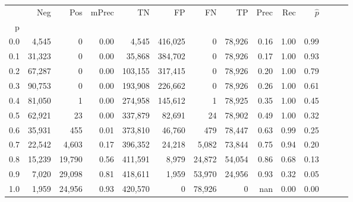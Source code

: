 \begin{tabular}{rrrrrrrrrrrrrr}
\toprule
{} &     Neg &     Pos & mPrec &       TN &       FP &      FN &      TP &  Prec &   Rec & $\hat{p}$ \\
p   &         &         &       &          &          &         &         &       &       &           \\
\midrule
0.0 &   4,545 &       0 &  0.00 &    4,545 &  416,025 &       0 &  78,926 &  0.16 &  1.00 &      0.99 \\
0.1 &  31,323 &       0 &  0.00 &   35,868 &  384,702 &       0 &  78,926 &  0.17 &  1.00 &      0.93 \\
0.2 &  67,287 &       0 &  0.00 &  103,155 &  317,415 &       0 &  78,926 &  0.20 &  1.00 &      0.79 \\
0.3 &  90,753 &       0 &  0.00 &  193,908 &  226,662 &       0 &  78,926 &  0.26 &  1.00 &      0.61 \\
0.4 &  81,050 &       1 &  0.00 &  274,958 &  145,612 &       1 &  78,925 &  0.35 &  1.00 &      0.45 \\
0.5 &  62,921 &      23 &  0.00 &  337,879 &   82,691 &      24 &  78,902 &  0.49 &  1.00 &      0.32 \\
0.6 &  35,931 &     455 &  0.01 &  373,810 &   46,760 &     479 &  78,447 &  0.63 &  0.99 &      0.25 \\
0.7 &  22,542 &   4,603 &  0.17 &  396,352 &   24,218 &   5,082 &  73,844 &  0.75 &  0.94 &      0.20 \\
0.8 &  15,239 &  19,790 &  0.56 &  411,591 &    8,979 &  24,872 &  54,054 &  0.86 &  0.68 &      0.13 \\
0.9 &   7,020 &  29,098 &  0.81 &  418,611 &    1,959 &  53,970 &  24,956 &  0.93 &  0.32 &      0.05 \\
1.0 &   1,959 &  24,956 &  0.93 &  420,570 &        0 &  78,926 &       0 &   nan &  0.00 &      0.00 \\
\bottomrule
\end{tabular}
